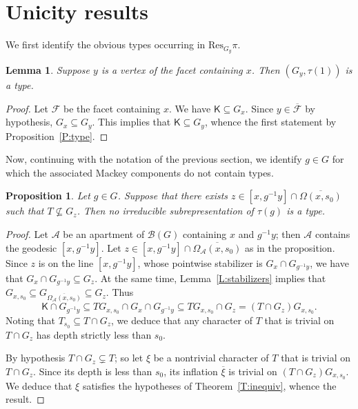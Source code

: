 \documentclass[12pt]{amsart}
\newcommand{\Res}{\mathrm{Res}} %
\newcommand{\Bset}{\Omega}
\newcommand{\apart}{{\mathcal{A}}}
\newcommand{\Aset}{\Omega_{\apart}}
\newcommand{\buil}{\mathcal{B}}
\newcommand{\F}{\mathcal{F}} %
\newcommand{\KT}{\mathsf{K}}
\theoremstyle{plain}
\newtheorem{lemma}[theorem]{Lemma}
\newtheorem{proposition}[theorem]{Proposition}
\theoremstyle{definition}
\theoremstyle{remark}
\numberwithin{equation}{section}
\numberwithin{figure}{section}
\begin{document}
\section{Unicity results}\label{S:unicity}

We first identify the obvious types occurring in $\Res_{G_y}\pi$.

\begin{lemma} \label{L:obvious}
Suppose $y$ is a vertex of the facet containing $x$.  Then $(G_y,\tau(1))$ is a type. 
\end{lemma}

\begin{proof}
Let $\F$ be the facet containing $x$.  We have $\KT\subseteq G_x$.  Since $y \in \overline{\F}$ by hypothesis, $G_x \subseteq G_y$.  This implies that $\KT\subseteq G_y$, whence the first statement by Proposition~\ref{P:type}.  
\end{proof}


Now, continuing with the notation of the previous section, we identify $g\in G$ for which the associated Mackey components do not contain types.


\begin{proposition}\label{P:line}
Let $g \in G$. Suppose that there exists $z\in [x,g^{-1}y]\cap \overline{\Bset(x,s_0)}$ such that $T \not\subseteq G_z$.  Then no irreducible subrepresentation of $\tau(g)$
is a type.
\end{proposition}

\begin{proof}
Let $\apart$ be an apartment of $\buil(G)$ containing $x$ and $g^{-1}y$; then $\apart$ contains the geodesic $[x,g^{-1}y]$.  Let $z\in [x,g^{-1}y]\cap \overline{\Aset(x,s_0)}$ as in the proposition.  Since $z$ is on the line $[x,g^{-1}y]$, whose pointwise stabilizer is $G_x\cap G_{g^{-1}y}$, we have that $G_x\cap G_{g^{-1}y} \subseteq G_z$.  At the same time, Lemma~\ref{L:stabilizers} implies that $G_{x,s_0}\subseteq G_{\overline{\Aset(x,s_0)}}\subseteq G_z$.  Thus
$$
\KT \cap G_{g^{-1}y} \subseteq TG_{x,s_0} \cap G_x \cap G_{g^{-1}y} \subseteq TG_{x,s_0}\cap G_z = (T\cap G_z)G_{x,s_0}.
$$
 Noting that $T_{s_0} \subseteq T\cap G_z$, we deduce that any character of $T$ that is trivial on $T\cap G_z$ has depth strictly less than $s_0$.  
 
By hypothesis $T\cap G_z \subsetneq T$; so let $\xi$ be a nontrivial character of $T$ that is trivial on $T\cap G_z$.  Since its depth is less than $s_0$, its inflation $\overline{\xi}$ is trivial on $(T\cap G_z)G_{x,s_0}$.  We deduce that $\xi$ satisfies the hypotheses of Theorem~\ref{T:inequiv}, whence the result.
\end{proof}
\end{document}
